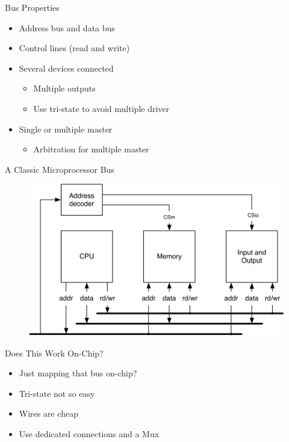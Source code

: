 \begin{frame}[fragile]{Bus Properties}
\begin{itemize}
\item Address bus and data bus
\item Control lines (read and write)
\item Several devices connected
\begin{itemize}
\item Multiple outputs
\item Use tri-state to avoid multiple driver
\end{itemize}
\item Single or multiple master
\begin{itemize}
\item Arbitration for multiple master
\end{itemize}
\end{itemize}
\end{frame}

\begin{frame}[fragile]{A Classic Microprocessor Bus}
\begin{figure}
  \includegraphics[scale=\scale]{../figures/bus}
\end{figure}
\end{frame}



\begin{frame}[fragile]{Does This Work On-Chip?}
\begin{itemize}
\item Just mapping that bus on-chip?
\item Tri-state not so easy
\item Wires are cheap
\item Use dedicated connections and a Mux
\end{itemize}
\end{frame}

